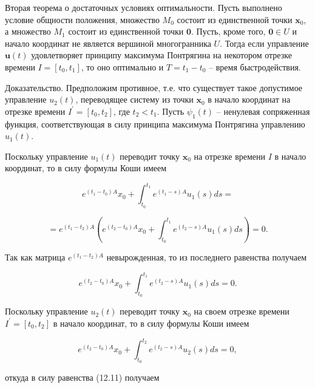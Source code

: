 \documentclass[8pt]{extarticle}
\begin{document}
Вторая теорема о достаточных условиях оптимальности. Пусть выполнено условие общности положения, множество \(M_{0}\) состоит из единственной точки \(\mathbf{x}_{0}\), а множество \(M_{1}\) состоит из единственной точки \(\mathbf{0}\). Пусть, кроме того, \(\mathbf{0} \in U\) и начало координат не является вершиной многогранника \(U\). Тогда если управление \(\mathbf{u}(t)\) удовлетворяет принципу максимума Понтрягина на некотором отрезке времени \(I = \left[ t_{0},t_{1}\right]\), то оно оптимально и \(T = {t}_{1} - {t}_{0}\) -- время быстродействия.

Доказательство. Предположим противное, т.е. что существует такое допустимое управление \({u}_{2}\left( t\right)\), переводящее систему из точки \({\mathbf{x}}_{0}\) в начало координат на отрезке времени \({I}^{\prime } = \left\lbrack  {{t}_{0},{t}_{2}}\right\rbrack\), где \({t}_{2} < {t}_{1}\). Пусть \({\psi }_{1}\left( t\right)\) -- ненулевая сопряженная функция, соответствующая в силу принципа максимума Понтрягина управлению \({u}_{1}\left( t\right)\).

Поскольку управление \({u}_{1}\left( t\right)\) переводит точку \({\mathbf{x}}_{0}\) на отрезке времени \(I\) в начало координат, то в силу формулы Коши имеем

\[
{e}^{\left( {{t}_{1} - {t}_{0}}\right) A}{x}_{0} + {\int }_{{t}_{0}}^{{t}_{1}}{e}^{\left( {{t}_{1} - s}\right) A}{u}_{1}\left( s\right) {ds} =
\]

\[
= {e}^{\left( {{t}_{1} - {t}_{2}}\right) A}\left( {{e}^{\left( {{t}_{2} - {t}_{0}}\right) A}{x}_{0} + {\int }_{{t}_{0}}^{{t}_{1}}{e}^{\left( {{t}_{2} - s}\right) A}{u}_{1}\left( s\right) {ds}}\right)  = 0.
\]

Так как матрица \({e}^{\left( {{t}_{1} - {t}_{2}}\right) A}\) невырожденная, то из последнего равенства получаем

\[
{e}^{\left( {{t}_{2} - {t}_{0}}\right) A}{x}_{0} + {\int }_{{t}_{0}}^{{t}_{1}}{e}^{\left( {{t}_{2} - s}\right) A}{u}_{1}\left( s\right) {ds} = 0. \tag{12.11}
\]

Поскольку управление \({u}_{2}\left( t\right)\) переводит точку \({\mathbf{x}}_{0}\) на своем отрезке времени \({I}^{\prime } = \left\lbrack  {{t}_{0},{t}_{2}}\right\rbrack\) в начало координат, то в силу формулы Коши имеем

\[
{e}^{\left( {{t}_{2} - {t}_{0}}\right) A}{x}_{0} + {\int }_{{t}_{0}}^{{t}_{2}}{e}^{\left( {{t}_{2} - s}\right) A}{u}_{2}\left( s\right) {ds} = 0,
\]

откуда в силу равенства (12.11) получаем
\end{document}
